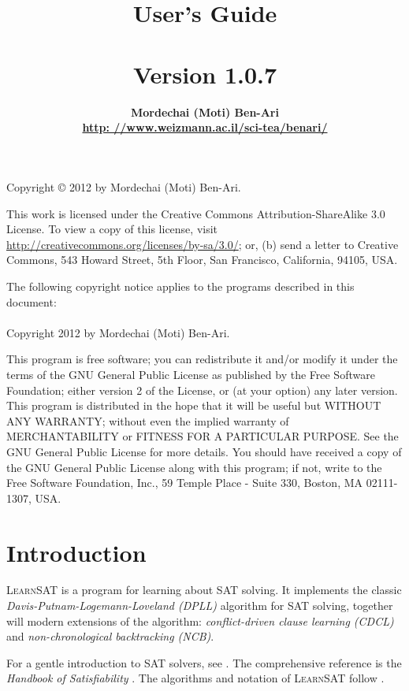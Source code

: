 \documentclass[11pt]{article}
\author{\bfseries Mordechai (Moti) Ben-Ari\\\url{http: //www.weizmann.ac.il/sci-tea/benari/}}
\title{\bfseries \ls\\\mbox{}\\
\bfseries\large User's Guide\\\mbox{}\\
\bfseries\normalsize Version 1.0.7}
\newcommand*{\ls}{\textsc{LearnSAT}}
\begin{document}
\maketitle
\thispagestyle{empty}

\vfill

\begin{center}
Copyright \copyright{} 2012 by Mordechai (Moti) Ben-Ari.
\end{center}
This work is licensed under the Creative Commons Attribution-ShareAlike 3.0
License. To view a copy of this license, visit
\url{http://creativecommons.org/licenses/by-sa/3.0/}; or, (b) send a letter
to Creative Commons, 543 Howard Street, 5th Floor, San Francisco,
California, 94105, USA.

\bigskip

 
\begin{center}
The following copyright notice applies to the programs described in this
document:\mbox{}\\\mbox{}\\
Copyright 2012 by Mordechai (Moti) Ben-Ari.
\end{center}

This program is free software; you can redistribute it and/or
modify it under the terms of the GNU General Public License
as published by the Free Software Foundation; either version 2
of the License, or (at your option) any later version.
This program is distributed in the hope that it will be useful
but WITHOUT ANY WARRANTY; without even the implied warranty of
MERCHANTABILITY or FITNESS FOR A PARTICULAR PURPOSE.
See the GNU General Public License for more details.
You should have received a copy of the GNU General Public License
along with this program; if not, write to the Free Software
Foundation, Inc., 59 Temple Place - Suite 330, Boston, MA
02111-1307, USA.

\newpage

\section{Introduction}

\ls{} is a program for learning about SAT solving. It implements the
classic \emph{Davis-Putnam-Logemann-Loveland (DPLL)} algorithm for SAT
solving, together will modern extensions of the algorithm:
\emph{conflict-driven clause learning (CDCL)} and
\emph{non-chronological backtracking (NCB)}.

For a gentle introduction to SAT solvers, see \cite[Chapter~6]{mlcs}.
The comprehensive reference is the \emph{Handbook of Satisfiability}
\cite{SAT}. The algorithms and notation of \ls{} follow \cite{mlm}.
\end{document}

